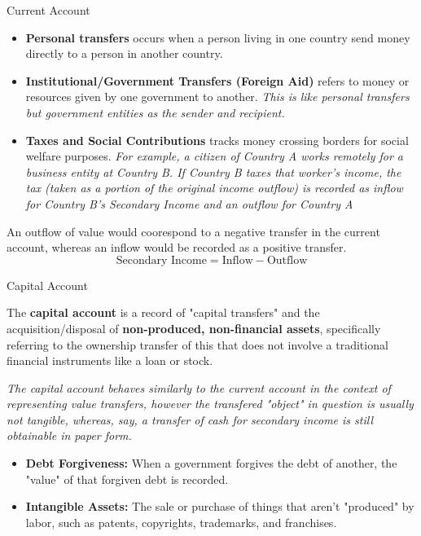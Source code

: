 \documentclass[10pt]{article}
\begin{document}
\begin{core}{Current Account}
\begin{enumerate}
        \begin{itemize}

          \item \textbf{Personal transfers} occurs when a person living in one country send money directly to a person in another country.

          \item \textbf{Institutional/Government Transfers (Foreign Aid)} refers to money or resources given by one government to another. \textit{This is like personal transfers but government entities as the sender and recipient.}

          \item \textbf{Taxes and Social Contributions} tracks money crossing borders for social welfare purposes. \textit{For example, a citizen of Country A works remotely for a business entity at Country B. If Country B taxes that worker's income, the tax (taken as a portion of the original income outflow) is recorded as inflow for Country B's Secondary Income and an outflow for Country A}

        \end{itemize}

        An outflow of value would coorespond to a negative transfer in the current account, whereas an inflow would be recorded as a positive transfer.
        \[
          \text{Secondary Income} = \text{Inflow} - \text{Outflow}
        \]

      \end{enumerate}

    \end{core}

    \begin{core}{Capital Account}

      The \textbf{capital account} is a record of "capital transfers" and the acquisition/disposal of \textbf{non-produced, non-financial assets}, specifically referring to the ownership transfer of this that does not involve a traditional financial instruments like a loan or stock.

      \textit{The capital account behaves similarly to the current account in the context of representing value transfers, however the transfered "object" in question is usually not tangible, whereas, say, a transfer of cash for secondary income is still obtainable in paper form.}

      \begin{itemize}

        \item \textbf{Debt Forgiveness:} When a government forgives the debt of another, the "value" of that forgiven debt is recorded.

        \item \textbf{Intangible Assets:} The sale or purchase of things that aren't "produced" by labor, such as patents, copyrights, trademarks, and franchises.

      \end{itemize}

    \end{core}
\end{document}

